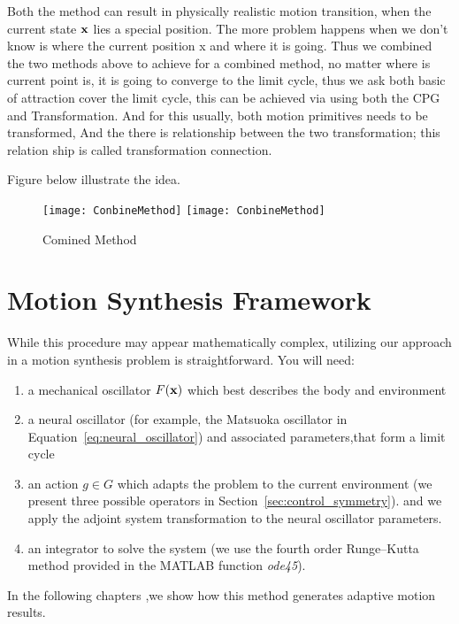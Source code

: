 Both the method can result in physically realistic motion transition, when the current state $\mathbf{x}$ lies a special position.
The more problem happens when we don't know is where the current position x and where it is going.
Thus we combined the two methods above to achieve for a combined method,
no matter where is current point is, it is going to converge to the limit cycle, thus we ask both basic of attraction cover the limit cycle, this can be achieved via using both the CPG and Transformation.
And for this usually, both motion primitives needs to be transformed,
And the there is relationship between the two transformation; this relation ship is called transformation connection.

Figure below illustrate the idea.

\begin{figure}[!htbp]
  \begin{center}
    \leavevmode
    \ifpdf
      \texttt{[image: ConbineMethod]}
    \else
      \texttt{[image: ConbineMethod]}
    \fi
    \caption{Comined Method}
    \label{fig:Combine}
  \end{center}
\end{figure}

\section{Motion Synthesis Framework}
While this procedure may appear mathematically complex, utilizing our approach in a motion synthesis problem is straightforward. You will need:
\begin{enumerate}
\item a mechanical oscillator $F(\mathbf{x})$ which best describes the body and environment
\item a neural oscillator (for example, the Matsuoka oscillator in Equation~\ref{eq:neural_oscillator}) and associated parameters,that form a limit cycle

\item an action $g \in G$ which adapts the problem to the current environment (we present three possible operators in Section~\ref{sec:control_symmetry}). and we apply the adjoint system transformation to the neural oscillator parameters.

\item an integrator to solve the system (we use the fourth order Runge--Kutta method provided in the {MATLAB} function \emph{ode45}).
\end{enumerate}
In the following chapters ,we show how this method generates adaptive motion results.



